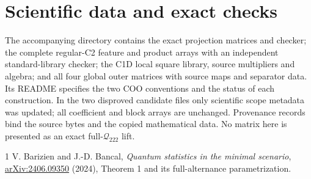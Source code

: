 \documentclass[11pt]{article}
\newcommand{\Q}{\mathcal Q_{222}}
\begin{document}
\section*{Scientific data and exact checks}

The accompanying  directory contains the exact
projection matrices and checker; the complete regular-C2 feature and
product arrays with an independent standard-library checker; the C1D
local square library, source multipliers and algebra; and all four global
outer matrices with source maps and separator data. Its README specifies
the two COO conventions and the status of each construction. In the
two disproved candidate files only scientific scope metadata was updated;
all coefficient and block arrays are unchanged. Provenance records bind
the source bytes and the copied mathematical data. No matrix here is
presented as an exact full-$\Q$ lift.
\begin{thebibliography}{1}
 V. Barizien and J.-D. Bancal,
\emph{Quantum statistics in the minimal scenario},
\href{https://arxiv.org/abs/2406.09350}{arXiv:2406.09350} (2024),
Theorem 1 and its full-alternance parametrization.
\end{thebibliography}
\end{document}
